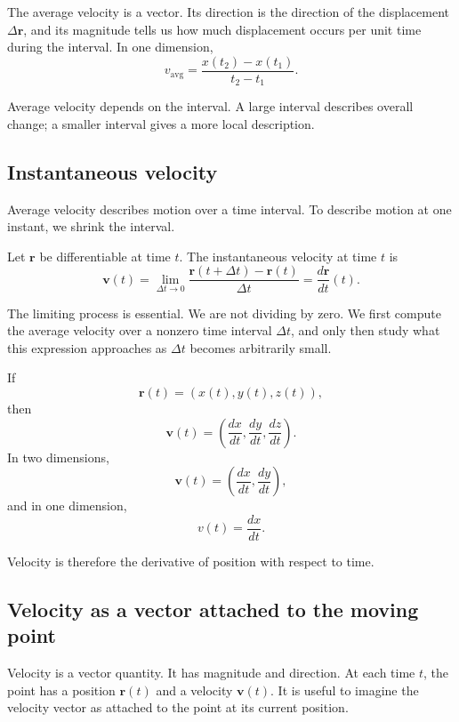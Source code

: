 The average velocity is a vector. Its direction is the direction of the displacement \(\Delta\mathbf{r}\), and its magnitude tells us how much displacement occurs per unit time during the interval. In one dimension,
\[
v_{\mathrm{avg}}=
\frac{x(t_2)-x(t_1)}{t_2-t_1}.
\]

\begin{remarkbox}
Average velocity depends on the interval. A large interval describes overall change; a smaller interval gives a more local description.
\end{remarkbox}

\subsection{Instantaneous velocity}

Average velocity describes motion over a time interval. To describe motion at one instant, we shrink the interval.

\begin{definitionbox}
Let \(\mathbf{r}\) be differentiable at time \(t\). The instantaneous velocity at time \(t\) is
\[
\mathbf{v}(t)
=
\lim_{\Delta t\to 0}
\frac{\mathbf{r}(t+\Delta t)-\mathbf{r}(t)}{\Delta t}
=
\frac{d\mathbf{r}}{dt}(t).
\]
\end{definitionbox}

The limiting process is essential. We are not dividing by zero. We first compute the average velocity over a nonzero time interval \(\Delta t\), and only then study what this expression approaches as \(\Delta t\) becomes arbitrarily small.

If
\[
\mathbf{r}(t)=(x(t),y(t),z(t)),
\]
then
\[
\mathbf{v}(t)=\left(\frac{dx}{dt},\frac{dy}{dt},\frac{dz}{dt}\right).
\]
In two dimensions,
\[
\mathbf{v}(t)=\left(\frac{dx}{dt},\frac{dy}{dt}\right),
\]
and in one dimension,
\[
v(t)=\frac{dx}{dt}.
\]

Velocity is therefore the derivative of position with respect to time.

\subsection{Velocity as a vector attached to the moving point}

Velocity is a vector quantity. It has magnitude and direction. At each time \(t\), the point has a position \(\mathbf{r}(t)\) and a velocity \(\mathbf{v}(t)\). It is useful to imagine the velocity vector as attached to the point at its current position.

